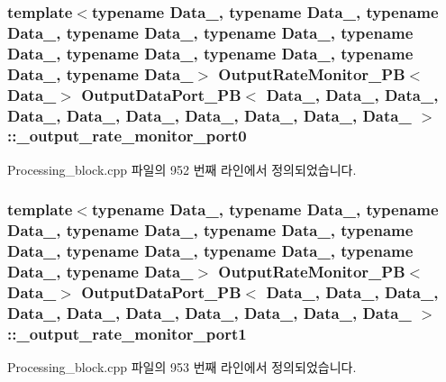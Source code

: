 \subsubsection[{\texorpdfstring{\+\_\+output\+\_\+rate\+\_\+monitor\+\_\+port0}{_output_rate_monitor_port0}}]{\setlength{\rightskip}{0pt plus 5cm}template$<$typename Data\+\_, typename Data\+\_, typename Data\+\_, typename Data\+\_, typename Data\+\_, typename Data\+\_, typename Data\+\_, typename Data\+\_, typename Data\+\_, typename Data\+\_$>$ {\bf Output\+Rate\+Monitor\+\_\+\+PB}$<$Data\+\_$>$ {\bf Output\+Data\+Port\+\_\+\+PB}$<$ Data\+\_, Data\+\_, Data\+\_, Data\+\_, Data\+\_, Data\+\_, Data\+\_, Data\+\_, Data\+\_, Data\+\_ $>$\+::\+\_\+output\+\_\+rate\+\_\+monitor\+\_\+port0\hspace{0.3cm}{\ttfamily [private]}}\hypertarget{classOutputDataPort__PB_a9769b9c90c8012660cf4b45a2d334b6e}{}\label{classOutputDataPort__PB_a9769b9c90c8012660cf4b45a2d334b6e}


Processing\+\_\+block.\+cpp 파일의 952 번째 라인에서 정의되었습니다.

\subsubsection[{\texorpdfstring{\+\_\+output\+\_\+rate\+\_\+monitor\+\_\+port1}{_output_rate_monitor_port1}}]{\setlength{\rightskip}{0pt plus 5cm}template$<$typename Data\+\_, typename Data\+\_, typename Data\+\_, typename Data\+\_, typename Data\+\_, typename Data\+\_, typename Data\+\_, typename Data\+\_, typename Data\+\_, typename Data\+\_$>$ {\bf Output\+Rate\+Monitor\+\_\+\+PB}$<$Data\+\_$>$ {\bf Output\+Data\+Port\+\_\+\+PB}$<$ Data\+\_, Data\+\_, Data\+\_, Data\+\_, Data\+\_, Data\+\_, Data\+\_, Data\+\_, Data\+\_, Data\+\_ $>$\+::\+\_\+output\+\_\+rate\+\_\+monitor\+\_\+port1\hspace{0.3cm}{\ttfamily [private]}}\hypertarget{classOutputDataPort__PB_a9a25f52cb2a6e719792ba9e6b74a5ba6}{}\label{classOutputDataPort__PB_a9a25f52cb2a6e719792ba9e6b74a5ba6}


Processing\+\_\+block.\+cpp 파일의 953 번째 라인에서 정의되었습니다.


